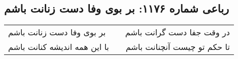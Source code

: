 \begin{center}
\section*{رباعی شماره ۱۱۷۶: بر بوی وفا دست زنانت باشم}
\label{sec:1176}
\begin{longtable}{l p{0.5cm} r}
بر بوی وفا دست زنانت باشم
&&
در وقت جفا دست گرانت باشم
\\
با این همه اندیشه کنانت باشم
&&
تا حکم تو چیست آنچنانت باشم
\\
\end{longtable}
\end{center}

